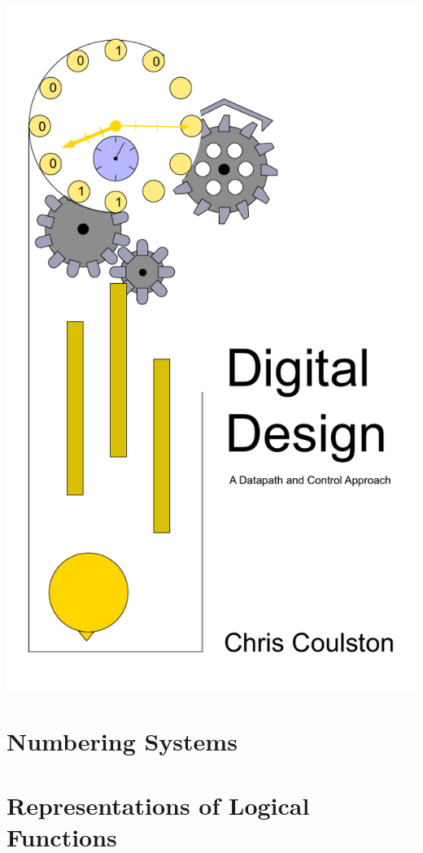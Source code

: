 \documentclass[letterpaper, 10pt]{memoir}
\begin{document}
\frontmatter
 \title{}
\includegraphics{./Fig/colorCover}
 \maketitle
 
 

\tableofcontents
\showanswers

\mainmatter

\chapter{Numbering Systems}


\chapter{Representations of Logical Functions}

\end{document}
